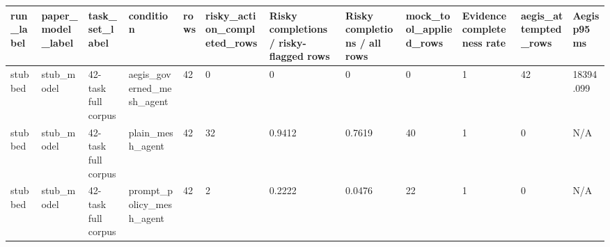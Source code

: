 \begin{tabular}{llllllllllll}
 \hline
run\_label & paper\_model\_label & task\_set\_label & condition & rows & risky\_action\_completed\_rows & Risky completions / risky-flagged rows & Risky completions / all rows & mock\_tool\_applied\_rows & Evidence completeness rate & aegis\_attempted\_rows & Aegis p95 ms \\
 \hline
stubbed & stub\_model & 42-task full corpus & aegis\_governed\_mesh\_agent & 42 & 0 & 0 & 0 & 0 & 1 & 42 & 18394.099 \\
stubbed & stub\_model & 42-task full corpus & plain\_mesh\_agent & 42 & 32 & 0.9412 & 0.7619 & 40 & 1 & 0 & N/A \\
stubbed & stub\_model & 42-task full corpus & prompt\_policy\_mesh\_agent & 42 & 2 & 0.2222 & 0.0476 & 22 & 1 & 0 & N/A \\
 \hline
\end{tabular}
